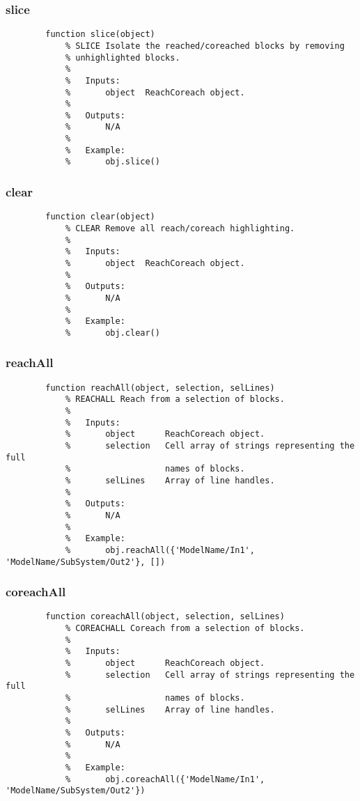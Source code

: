 \documentclass[12pt,letterpaper]{report}
\begin{document}
		\subsubsection{slice}
\begin{lstlisting}
        function slice(object)
            % SLICE Isolate the reached/coreached blocks by removing
            % unhighlighted blocks.
            %
            %   Inputs:
            %       object  ReachCoreach object.
            %
            %   Outputs:
            %       N/A
            %
            %   Example:
            %       obj.slice()
\end{lstlisting}
		
		\subsubsection{clear}
\begin{lstlisting}
        function clear(object)
            % CLEAR Remove all reach/coreach highlighting.
            %
            %   Inputs:
            %       object  ReachCoreach object.
            %
            %   Outputs:
            %       N/A
            %
            %   Example:
            %       obj.clear()
\end{lstlisting}
		
		\subsubsection{reachAll}
\begin{lstlisting}
        function reachAll(object, selection, selLines)
            % REACHALL Reach from a selection of blocks.
            %
            %   Inputs:
            %       object      ReachCoreach object.
            %       selection   Cell array of strings representing the full
            %                   names of blocks.
            %       selLines    Array of line handles.
            %
            %   Outputs:
            %       N/A
            %
            %   Example:
            %       obj.reachAll({'ModelName/In1', 'ModelName/SubSystem/Out2'}, [])
\end{lstlisting}
		
		\subsubsection{coreachAll}
\begin{lstlisting}
        function coreachAll(object, selection, selLines)
            % COREACHALL Coreach from a selection of blocks.
            %
            %   Inputs:
            %       object      ReachCoreach object.
            %       selection   Cell array of strings representing the full
            %                   names of blocks.
            %       selLines    Array of line handles.
            %
            %   Outputs:
            %       N/A
            %
            %   Example:
            %       obj.coreachAll({'ModelName/In1', 'ModelName/SubSystem/Out2'})
\end{lstlisting}
		
\end{document}
